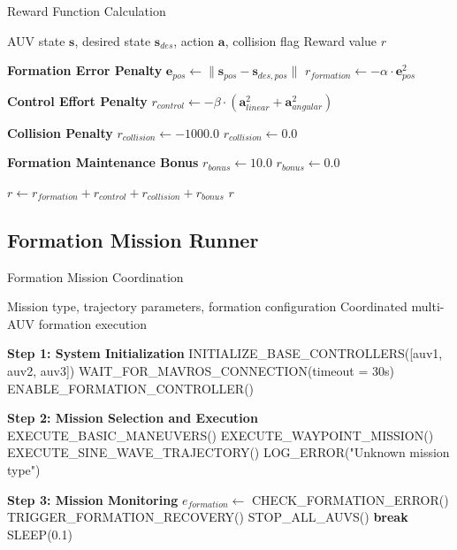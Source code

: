 \documentclass[11pt,a4paper]{article}
\newcommand{\vect}[1]{\boldsymbol{#1}}
\begin{document}
\begin{algorithm}[H]
\caption{Reward Function Calculation}
\label{alg:reward_calc}
\begin{algorithmic}[1]
\Require AUV state $\vect{s}$, desired state $\vect{s}_{des}$, action $\vect{a}$, collision flag
\Ensure Reward value $r$

\State \textbf{Formation Error Penalty}
\State $\vect{e}_{pos} \leftarrow \|\vect{s}_{pos} - \vect{s}_{des,pos}\|$
\State $r_{formation} \leftarrow -\alpha \cdot \vect{e}_{pos}^2$

\State \textbf{Control Effort Penalty}
\State $r_{control} \leftarrow -\beta \cdot (\vect{a}_{linear}^2 + \vect{a}_{angular}^2)$

\State \textbf{Collision Penalty}
    \State $r_{collision} \leftarrow -1000.0$
\Else
    \State $r_{collision} \leftarrow 0.0$
\EndIf

\State \textbf{Formation Maintenance Bonus}
\If{$\vect{e}_{pos} <$ formation\_tolerance}
    \State $r_{bonus} \leftarrow 10.0$
\Else
    \State $r_{bonus} \leftarrow 0.0$
\EndIf

\State $r \leftarrow r_{formation} + r_{control} + r_{collision} + r_{bonus}$
\Return $r$
\end{algorithmic}
\end{algorithm}

\subsection{Formation Mission Runner}

\begin{algorithm}[H]
\caption{Formation Mission Coordination}
\label{alg:mission_coordination}
\begin{algorithmic}[1]
\Require Mission type, trajectory parameters, formation configuration
\Ensure Coordinated multi-AUV formation execution

\State \textbf{Step 1: System Initialization}
\State INITIALIZE\_BASE\_CONTROLLERS([auv1, auv2, auv3])
\State WAIT\_FOR\_MAVROS\_CONNECTION(timeout = 30s)
\State ENABLE\_FORMATION\_CONTROLLER()

\State \textbf{Step 2: Mission Selection and Execution}
        \State EXECUTE\_BASIC\_MANEUVERS()
    \EndCase
        \State EXECUTE\_WAYPOINT\_MISSION()
    \EndCase
        \State EXECUTE\_SINE\_WAVE\_TRAJECTORY()
    \EndCase
        \State LOG\_ERROR("Unknown mission type")
    \EndCase
\EndSwitch

\State \textbf{Step 3: Mission Monitoring}
    \State $e_{formation} \leftarrow$ CHECK\_FORMATION\_ERROR()
        \State TRIGGER\_FORMATION\_RECOVERY()
    \EndIf
        \State STOP\_ALL\_AUVS()
        \State \textbf{break}
    \EndIf
    \State SLEEP(0.1) 
\EndWhile
\end{algorithmic}
\end{algorithm}
\end{document}
